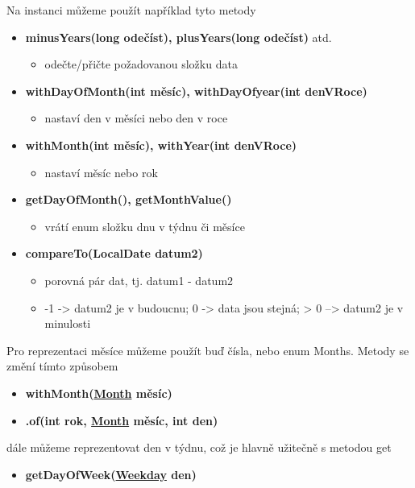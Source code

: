 \documentclass[11pt,a4paper,titlepage]{article}
\begin{document}
\newpage
Na instanci můžeme použít například tyto metody
\begin{itemize}
    \item \textbf{minusYears(long odečíst), plusYears(long odečíst)} atd.
    \begin{itemize}
        \item odečte/přičte požadovanou složku data
    \end{itemize}
    \item \textbf{withDayOfMonth(int měsíc), withDayOfyear(int denVRoce)}
    \begin{itemize}
        \item nastaví den v měsíci nebo den v roce
    \end{itemize}
    \item \textbf{withMonth(int měsíc), withYear(int denVRoce)}
    \begin{itemize}
        \item nastaví měsíc nebo rok
    \end{itemize}
        \item \textbf{getDayOfMonth(), getMonthValue()}
    \begin{itemize}
        \item vrátí enum složku dnu v týdnu či měsíce
    \end{itemize}
    \item \textbf{compareTo(LocalDate datum2)}
    \begin{itemize}
        \item porovná pár dat, tj. datum1 - datum2
        \item -1 -> datum2 je v budoucnu; 0 -> data jsou stejná; > 0 --> datum2 je v minulosti 
    \end{itemize}
\end{itemize}
Pro reprezentaci měsíce můžeme použít buď čísla, nebo enum Months. Metody se změní tímto způsobem
\begin{itemize}
    \item \textbf{withMonth(\underline{Month} měsíc)}
    \item \textbf{.of(int rok, \underline{Month} měsíc, int den)}
\end{itemize}
dále můžeme reprezentovat den v týdnu, což je hlavně užitečně s metodou get
\begin{itemize}
    \item \textbf{getDayOfWeek(\underline{Weekday} den)}
\end{itemize}
\parencite{java8_localdate}
\end{document}
